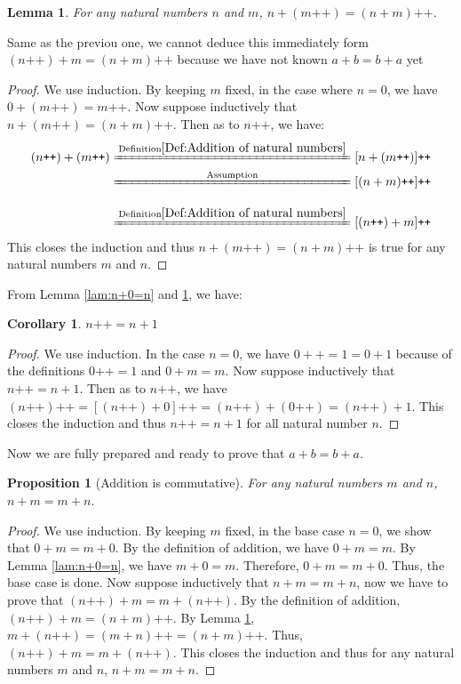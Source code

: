 \documentclass[a4paper,oneside]{book}
\newtheorem*{proof}{\textit{Proof.}}
\newtheorem{corollary}{Corollary}[section]
\newtheorem{lemma}{Lemma}[section]
\newtheorem{proposition}{Proposition}[section]
\begin{document}
			\begin{lemma}
				\label{lam:n+(m++)=(n+m)++}
				For any natural numbers $n$ and $m$, $n+(m\texttt{++})=(n+m)\texttt{++}$.
			\end{lemma}
			Same as the previou one, we cannot deduce this immediately form $(n\texttt{++})+m=(n+m)\texttt{++}$ because we have not known $a+b=b+a$ yet 
			\begin{proof}
				We use induction. By keeping $m$ fixed, in the case where $n=0$, we have $0+(m\texttt{++})=m\texttt{++}$. Now suppose inductively that $n+(m\texttt{++})=(n+m)\texttt{++}$. Then as to $n\texttt{++}$, we have:
				\begin{align*}
				(n\texttt{++})+(m\texttt{++})&\xlongequal{\mathrm{Definition \ref{Def:Addition of natural numbers}}}[n+(m\texttt{++})]\texttt{++}\\
				&\xlongequal[\phantom{\mathrm{Definition \ref{Def:Addition of natural numbers}}}]{\mathrm{Assumption}}[(n+m)\texttt{++}]\texttt{++}\\
				&\xlongequal{\mathrm{Definition \ref{Def:Addition of natural numbers}}}[(n\texttt{++})+m]\texttt{++}
				\end{align*}
				This closes the induction and thus $n+(m\texttt{++})=(n+m)\texttt{++}$ is true for any natural numbers $m$ and $n$.
			\end{proof}
			From Lemma \ref{lam:n+0=n} and \ref{lam:n+(m++)=(n+m)++}, we have:
			\begin{corollary}
				\label{coro:n++=n+1}
				$n\texttt{++}=n+1$
			\end{corollary}
			\begin{proof}
				We use induction. In the case $n=0$, we have $0++=1=0+1$ because of the definitions $0\texttt{++}=1$ and $0+m=m$. Now suppose inductively that $n\texttt{++}=n+1$. Then as to $n\texttt{++}$, we have $(n\texttt{++})\texttt{++}=[(n\texttt{++})+0]\texttt{++}=(n\texttt{++})+(0\texttt{++})=(n\texttt{++})+1$. This closes the induction and thus $n\texttt{++}=n+1$ for all natural number $n$.
			\end{proof}
			Now we are fully prepared and ready to prove that $a+b=b+a$.
			\begin{proposition}[Addition is commutative]
				\label{pro:addition commutative}
				For any natural numbers $m$ and $n$, $n+m=m+n$.
			\end{proposition}
			\begin{proof}
				We use induction. By keeping $m$ fixed, in the base case $n=0$, we show that $0+m=m+0$. By the definition of addition, we have $0+m=m$. By Lemma \ref{lam:n+0=n}, we have $m+0=m$. Therefore, $0+m=m+0$. Thus, the base case is done. Now suppose inductively that $n+m=m+n$, now we have to prove that $(n\texttt{++})+m=m+(n\texttt{++})$. By the definition of addition, $(n\texttt{++})+m=(n+m)\texttt{++}$. By Lemma \ref{lam:n+(m++)=(n+m)++}, $m+(n\texttt{++})=(m+n)\texttt{++}=(n+m)\texttt{++}$. Thus, $(n\texttt{++})+m=m+(n\texttt{++})$. This closes the induction and thus for any natural numbers $m$ and $n$, $n+m=m+n$.
			\end{proof}
\end{document}
